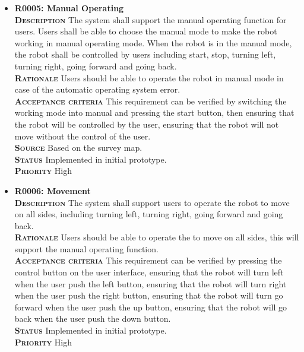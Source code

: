 \documentclass[11pt, a4paper]{article}
\begin{document}
\begin{itemize}
\item {\bfseries R0005: Manual Operating}\\
\textsc{\bfseries Description} The system shall support the manual operating function for users. Users shall be able to choose the manual mode to make the robot working in manual operating mode. When the robot is in the manual mode, the robot shall be controlled by users including start, stop, turning left, turning right, going forward and going back.\\
\textsc{\bfseries Rationale} Users should be able to operate the robot in manual mode in case of the automatic operating system error.\\
\textsc{\bfseries Acceptance criteria} This requirement can be verified by switching the working mode into manual and pressing the start button, then ensuring that the robot will be controlled by the user, ensuring that the robot will not move without the control of the user.\\
\textsc{\bfseries Source} Based on the survey map.\\
\textsc{\bfseries Status} Implemented in initial prototype.\\
\textsc{\bfseries Priority} High\\

\item {\bfseries R0006: Movement}\\
\textsc{\bfseries Description} The system shall support users to operate the robot to move on all sides, including turning left, turning right, going forward and going back.\\
\textsc{\bfseries Rationale} Users should be able to operate the to move on all sides, this will support the manual operating function.\\
\textsc{\bfseries Acceptance criteria} This requirement can be verified by pressing the control button on the user interface, ensuring that the robot will turn left when the user push the left button, ensuring that the robot will turn right when the user push the right button, ensuring that the robot will turn go forward when the user push the up button, ensuring that the robot will go back when the user push the down button.\\
\textsc{\bfseries Status} Implemented in initial prototype.\\
\textsc{\bfseries Priority} High\\
\end{itemize}
\end{document}
